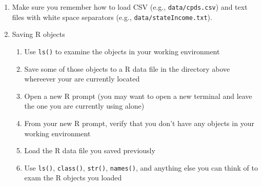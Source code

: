 \documentclass{article}
\begin{document}
\begin{enumerate}
\item Make sure you remember how to load CSV (e.g., \texttt{data/cpds.csv})
      and text files with white space separators (e.g., \texttt{data/stateIncome.txt}). 

\item Saving R objects
    \begin{enumerate}
    \item Use  \texttt{ls()} to examine the objects in your working environment
    \item Save some of those objects to a R data file in the directory above
          whereever your are currently located
    \item Open a new R prompt (you may want to open a new terminal and leave
          the one you are currently using alone)
    \item From your new R prompt, verify that you don't have any objects in your
          working environment
    \item Load the R data file you saved previously
    \item Use \texttt{ls()}, \texttt{class()}, \texttt{str()}, \texttt{names()},
          and anything else you can think of to exam the R objects you loaded

    \end{enumerate}

\end{enumerate}
\end{document}
